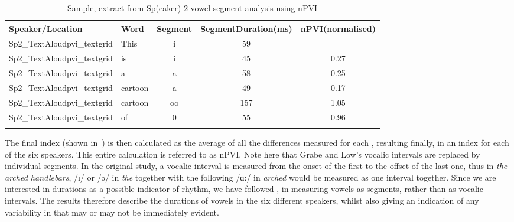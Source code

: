 \documentclass[output=paper]{langsci/langscibook}
\begin{document}
\begin{table}
\caption{\label{tab:key:grech1} Sample, extract from Sp(eaker) 2 vowel segment analysis using nPVI}
\begin{tabularx}{\textwidth}{llcSS}
\lsptoprule
\textbf{Speaker/Location} & \textbf{Word} & \textbf{Segment} & \textbf{Segment\newline Duration\newline (ms)} & \textbf{nPVI\newline (normalised)}\\
\midrule 
Sp2\_TextAloudpvi\_textgrid & This & i & 59 & \\
Sp2\_TextAloudpvi\_textgrid &  is  & i & 45 & 0.27 \\
Sp2\_TextAloudpvi\_textgrid &  a   & a & 58 & 0.25 \\
Sp2\_TextAloudpvi\_textgrid & cartoon & a & 49 & 0.17\\
Sp2\_TextAloudpvi\_textgrid & cartoon & oo  & 157 & 1.05\\
Sp2\_TextAloudpvi\_textgrid & of & 0 & 55 & 0.96 \\ 
\lspbottomrule
\end{tabularx}
\end{table}


The final index (shown in~) is then calculated as the average of all the differences measured for each , resulting finally, in an index for each of the six speakers. This entire calculation is referred to as nPVI. Note here that Grabe and Low's vocalic intervals are replaced by individual  segments. In the original \citet{GrabeLow2002} study, a vocalic interval is measured from the onset of the first  to the offset of the last one, thus in \textit{the arched handlebars}, /ɪ/ or /ə/ in \textit{the} together with the following /ɑ:/ in \textit{arched} would be measured as one interval together. Since we are interested in  durations as a possible indicator of rhythm, we have followed \citet{NokesHay2012}, in measuring vowels as segments, rather than as vocalic intervals. The results therefore describe the durations of vowels in the six different  speakers, whilst also giving an indication of any variability in  that may or may not be immediately evident. 
\end{document}
